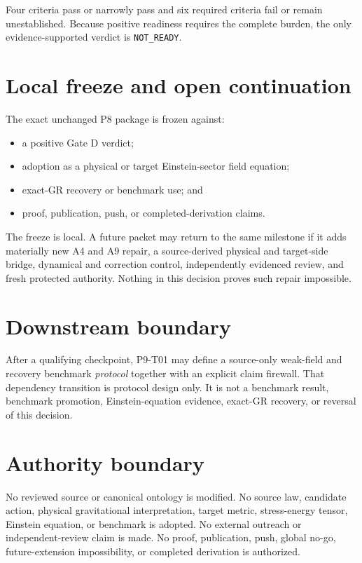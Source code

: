 \documentclass[11pt]{article}
\newcommand{\GateVerdict}{\texttt{NOT\_READY}}
\begin{document}
Four criteria pass or narrowly pass and six required criteria fail or remain
unestablished.  Because positive readiness requires the complete burden, the
only evidence-supported verdict is \GateVerdict.

\section{Local freeze and open continuation}

The exact unchanged P8 package is frozen against:
\begin{itemize}[leftmargin=*]
\item a positive Gate D verdict;
\item adoption as a physical or target Einstein-sector field equation;
\item exact-GR recovery or benchmark use; and
\item proof, publication, push, or completed-derivation claims.
\end{itemize}

The freeze is local.  A future packet may return to the same milestone if it
adds materially new A4 and A9 repair, a source-derived physical and target-side
bridge, dynamical and correction control, independently evidenced review, and
fresh protected authority.  Nothing in this decision proves such repair
impossible.

\section{Downstream boundary}

After a qualifying checkpoint, P9-T01 may define a source-only weak-field and
recovery benchmark \emph{protocol} together with an explicit claim firewall.
That dependency transition is protocol design only.  It is not a benchmark
result, benchmark promotion, Einstein-equation evidence, exact-GR recovery, or
reversal of this decision.

\section{Authority boundary}

No reviewed source or canonical ontology is modified.  No source law,
candidate action, physical gravitational interpretation, target metric,
stress-energy tensor, Einstein equation, or benchmark is adopted.  No
external outreach or independent-review claim is made.  No proof,
publication, push, global no-go, future-extension impossibility, or completed
derivation is authorized.
\end{document}
